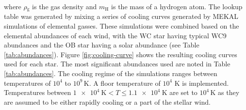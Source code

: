 \documentclass[fleqn,usenatbib]{mnras}
\newcommand{\rms}[1]{\ensuremath{_{\text{#1}}}}
\begin{document}
\noindent
where $\rho\rms{g}$ is the gas density and $m\rms{H}$ is the mass of a hydrogen atom.
The lookup table was generated by mixing a series of cooling curves generated by MEKAL simulations of elemental gasses.
These simulations were combined based on the elemental abundances of each wind, with the WC star having typical WC9 abundances and the OB star having a solar abundance (see Table \ref{tab:abundances}).
%
%
Figure \ref{fig:cooling-curve} shows the resulting cooling curves used for each star.
The most significant abundances used are noted in Table \ref{tab:abundances}.
The cooling regime of the simulations ranges between temperatures of $10^4$ to $10^9\,\si{\kelvin}$.
A floor temperature of $10^4$ \si{\kelvin} is implemented.
Temperatures between $\SI{1e4}{\kelvin} < T \leq \SI{1.1e4}{\kelvin}$ are set to $10^4\,\si{\kelvin}$ as they are assumed to be either rapidly cooling or a part of the stellar wind.
\end{document}
